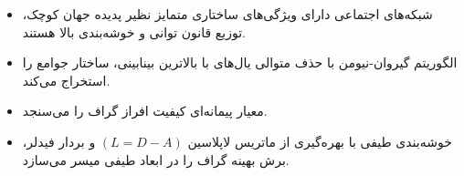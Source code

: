\begin{summarybox}
\begin{itemize}
    \item شبکه‌های اجتماعی دارای ویژگی‌های ساختاری متمایز نظیر پدیده جهان کوچک، توزیع قانون توانی و خوشه‌بندی بالا هستند.
    \item الگوریتم گیروان-نیومن با حذف متوالی یال‌های با بالاترین بینابینی، ساختار جوامع را استخراج می‌کند.
    \item معیار پیمانه‌ای  کیفیت افراز گراف را می‌سنجد.
    \item خوشه‌بندی طیفی با بهره‌گیری از ماتریس لاپلاسین $(L = D - A)$ و بردار فیدلر، برش بهینه گراف را در ابعاد طیفی میسر می‌سازد.
\end{itemize}
\end{summarybox}
